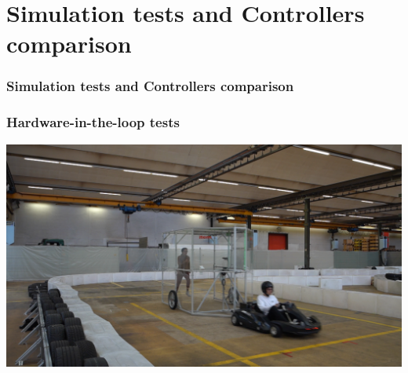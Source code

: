 \documentclass[10pt, aspectratio=169]{beamer}
\begin{document}
\section{Simulation tests and Controllers comparison}
\begin{frame}
\frametitle{Simulation tests and Controllers comparison}
\end{frame}


\begin{frame}
\frametitle{Hardware-in-the-loop tests}

\begin{center}
\href{video.mp4}{
\includegraphics[scale=0.25]
{Poster}}
\end{center}
\end{frame}
\end{document}
